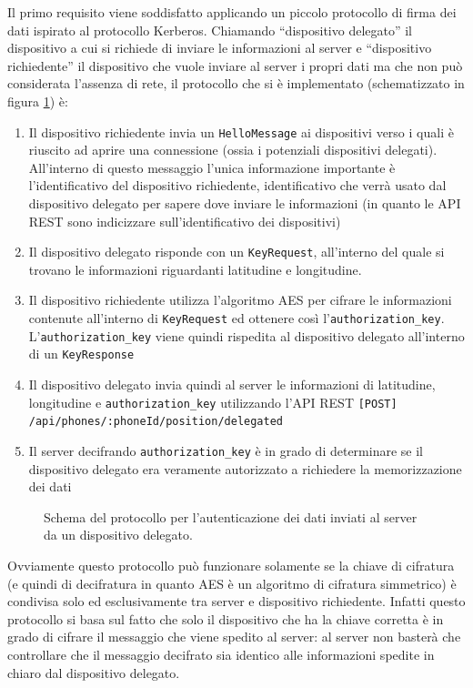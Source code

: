 Il primo requisito viene soddisfatto applicando un piccolo protocollo di firma dei dati ispirato al protocollo Kerberos. Chiamando ``dispositivo delegato'' il dispositivo a cui si richiede di inviare le informazioni al server e ``dispositivo richiedente'' il dispositivo che vuole inviare al server i propri dati ma che non può considerata l'assenza di rete, il protocollo che si è implementato (schematizzato in figura \ref{fig:protocolloBluetooth}) è:
\begin{enumerate}
  \item Il dispositivo richiedente invia un \texttt{HelloMessage} ai dispositivi verso i quali è riuscito ad aprire una connessione (ossia i potenziali dispositivi delegati). All'interno di questo messaggio l'unica informazione importante è l'identificativo del dispositivo richiedente, identificativo che verrà usato dal dispositivo delegato per sapere dove inviare le informazioni (in quanto le API REST sono indicizzare sull'identificativo dei dispositivi)
  \item Il dispositivo delegato risponde con un \texttt{KeyRequest}, all'interno del quale si trovano le informazioni riguardanti latitudine e longitudine.
  \item Il dispositivo richiedente utilizza l'algoritmo AES per cifrare le informazioni contenute all'interno di \texttt{KeyRequest} ed ottenere così l'\texttt{authorization\_key}. L'\texttt{authorization\_key} viene quindi rispedita al dispositivo delegato all'interno di un \texttt{KeyResponse}
  \item Il dispositivo delegato invia quindi al server le informazioni di latitudine, longitudine e \texttt{authorization\_key} utilizzando l'API REST \texttt{[POST] /api/phones/:phoneId/position/delegated}
  \item Il server decifrando \texttt{authorization\_key} è in grado di determinare se il dispositivo delegato era veramente autorizzato a richiedere la memorizzazione dei dati
\end{enumerate}
\begin{figure}[!ht]
\begin{center}
\makebox[\linewidth]{\securityProtocol}
\end{center}
\caption{Schema del protocollo per l'autenticazione dei dati inviati al server da un dispositivo delegato.}
\label{fig:protocolloBluetooth}
\end{figure}
Ovviamente questo protocollo può funzionare solamente se la chiave di cifratura (e quindi di decifratura in quanto AES è un algoritmo di cifratura simmetrico) è condivisa solo ed esclusivamente tra server e dispositivo richiedente. Infatti questo protocollo si basa sul fatto che solo il dispositivo che ha la chiave corretta è in grado di cifrare il messaggio che viene spedito al server: al server non basterà che controllare che il messaggio decifrato sia identico alle informazioni spedite in chiaro dal dispositivo delegato.\\
